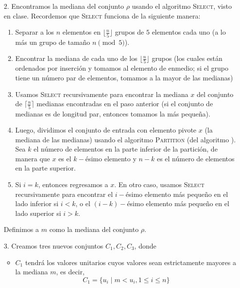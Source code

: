 \documentclass[letterpaper,11pt]{article}
\begin{document}
\begin{enumerate}
\begin{itemize}
\begin{itemize}
            \item[2.] Encontramos la mediana del conjunto $\rho$ usando el 
            algoritmo \textsc{Select}, visto en clase. Recordemos que 
            \textsc{Select} funciona de la siguiente manera:
            \begin{enumerate}
                \item Separar a los $n$ elementos en $\lfloor \frac{n}{5} \rfloor$ 
                grupos de $5$ elementos cada uno (a lo más un grupo de tamaño 
                $n \pmod{5}$).

                \item Encontrar la mediana de cada uno de los 
                $\lfloor \frac{n}{5} \rfloor$ grupos (los cuales están ordenados 
                por inserción y tomamos al elemento de enmedio; si el grupo tiene 
                un número par de elementos, tomamos a la mayor de las medianas)

                \item Usamos \textsc{Select} recursivamente para encontrar la 
                mediana $x$ del conjunto de $\lceil \frac{n}{5} \rceil$ medianas 
                encontradas en el paso anterior (si el conjunto de medianas es de 
                longitud par, entonces tomamos la más pequeña). 

                \item Luego, dividimos el conjunto de entrada con elemento pivote 
                $x$ (la mediana de las medianas) usando el algoritmo 
                \textsc{Partition} (del algoritmo ). Sea $k$ el 
                número de elementos en la parte inferior de la partición, de 
                manera que $x$ es el $k-$ésimo elemento y $n-k$ es el número de 
                elementos en la parte superior.

                \item Si $i = k$, entonces regresamos a $x$. En otro caso, 
                usamos \textsc{Select} recursivamente para encontrar el 
                $i-$ésimo elemento más pequeño en el lado inferior si $i < k$, o 
                el $(i-k)-$ésimo elemento más pequeño en el lado superior si 
                $i > k$.
            \end{enumerate}

            Definimos a $m$ como la mediana del conjunto $\rho$.
            
            \item[3.] Creamos tres nuevos conjuntos $C_1, C_2, C_3$, donde 
            \begin{itemize}
                \item $C_1$ tendrá los valores unitarios cuyos valores sean 
                estrictamente mayores a la mediana $m$, es decir, 
                \begin{equation*}
                    C_1 = \{u_i \; | \; m < u_i, 1 \leq i \leq n\}
                \end{equation*}


\end{itemize}
\end{itemize}
\end{itemize}
\end{enumerate}
\end{document}
